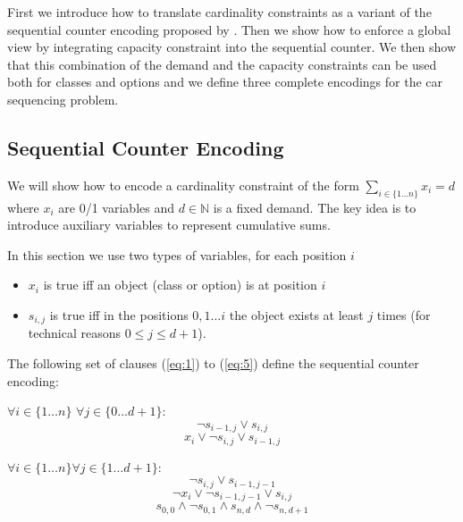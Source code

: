 \documentclass[]{llncs}
\begin{document}
First we introduce how to translate cardinality constraints as a variant of the sequential counter encoding proposed by
\cite{Sinz05}. Then we show how to enforce a global view by integrating capacity constraint into the sequential counter.
We then show that this combination of the demand and the capacity constraints can be used both for classes and options
and we define three complete encodings for the car sequencing problem. 

\subsection{Sequential Counter Encoding}
\label{sub:card}

We will show how to encode a cardinality constraint of the form $ \sum_{i\in \{1\ldots n\}} x_{i} = d $ where $x_i$ are
0/1 variables and $d\in \mathbb{N}$ is a fixed demand. The key idea is to introduce auxiliary variables to represent
cumulative sums.

In this section we use two types of variables, for each position $i$

\begin{itemize}
    \item  $x_i$ is true iff an object (class or option) is at position $i$
    \item  $s_{i,j}$ is true iff in the positions $0,1 \ldots i$ the object exists at least $j$ times (for technical
        reasons $0 \leq j \leq d+1$). 
\end{itemize} 

The following set of clauses (\ref{eq:1}) to (\ref{eq:5}) define the sequential counter encoding:

$\forall i \in \{1\ldots n\}$ $\forall j \in\{0 \ldots d+1\}$: 
\begin{equation} \label{eq:1}
    \neg s_{i-1,j} \vee s_{i,j}
\end{equation}
\begin{equation} \label{eq:2}
    x_{i} \vee \neg s_{i,j} \vee s_{i-1,j}
\end{equation}

$\forall {i \in \{1\ldots n\}} \forall {j\in \{1\ldots d+1\}}$: 
\begin{equation} \label{eq:3}
    \neg s_{i,j} \vee s_{i-1,j-1}
\end{equation}
\begin{equation} \label{eq:4}
    \neg x_{i} \vee \neg s_{i-1,j-1} \vee s_{i,j}
\end{equation}
\begin{equation} \label{eq:5}
     s_{0,0} \wedge \neg s_{0,1} \wedge s_{n,d} \wedge \neg s_{n,d+1}
\end{equation}
\end{document}
